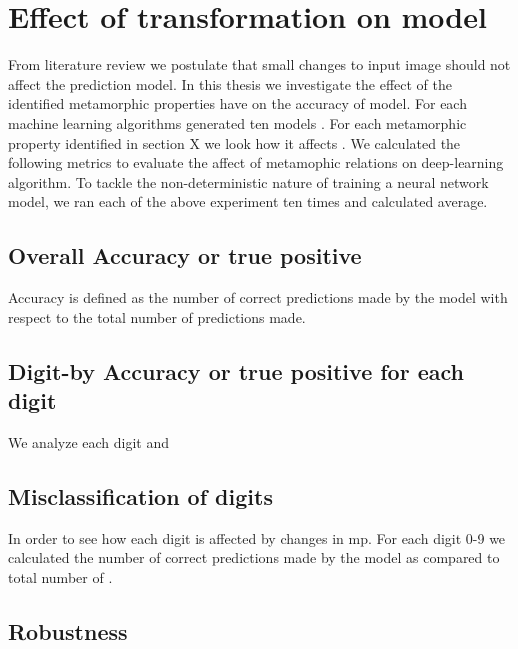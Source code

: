 \section{Effect of transformation on model}
From literature review we postulate that small changes to input image should not affect the prediction model. In this thesis we investigate the effect of the identified metamorphic properties have on the accuracy of model. For each machine learning algorithms generated ten models . For each metamorphic property identified in section X we look how it affects . We calculated the following metrics to evaluate the affect of metamophic relations on deep-learning algorithm. To tackle the non-deterministic nature of training a neural network model, we ran each of the above experiment ten times and calculated average.
\subsection{Overall Accuracy or true positive}
    Accuracy is defined as the number of correct predictions made by the model with respect to the total number of predictions made.
\subsection{Digit-by Accuracy or true positive for each digit}
    We analyze each digit and 
\subsection{Misclassification of digits}
    In order to see how each digit is affected by changes in  mp. For each digit 0-9 we calculated the number of correct predictions made by the model as compared to total number of .
\subsection{Robustness}
    
    
\clearpage
% 
